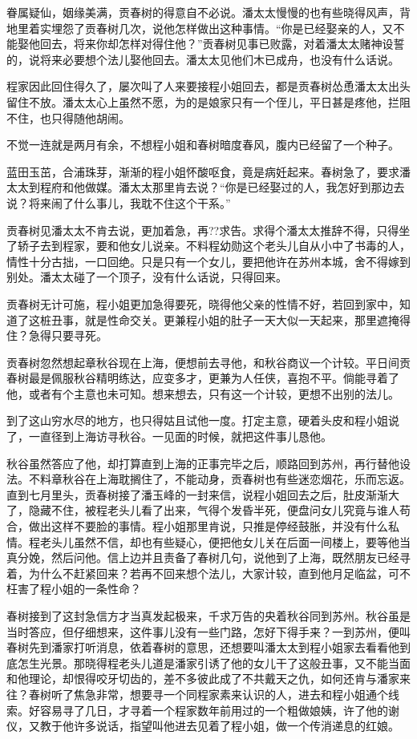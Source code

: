 \documentclass[12pt,UTF8]{ctexbook}
\begin{document}
{{{眷属疑仙，姻缘美满，贡春树的得意自不必说。潘太太慢慢的也有些晓得风声，背地里着实埋怨了贡春树几次，说他怎样做出这种事情。“你是已经娶亲的人，又不能娶他回去，将来你却怎样对得住他？”贡春树见事已败露，对着潘太太赌神设誓的，说将来必要想个法儿娶他回去。潘太太见他们木已成舟，也没有什么话说。

程家因此回住得久了，屡次叫了人来要接程小姐回去，都是贡春树怂恿潘太太出头留住不放。潘太太心上虽然不愿，为的是娘家只有一个侄儿，平日甚是疼他，拦阻不住，也只得随他胡闹。

不觉一连就是两月有余，不想程小姐和春树暗度春风，腹内已经留了一个种子。

蓝田玉茁，合浦珠芽，渐渐的程小姐怀酸呕食，竟是病妊起来。春树急了，要求潘太太到程府和他做媒。潘太太那里肯去说？“你是已经娶过的人，我怎好到那边去说？将来闹了什么事儿，我耽不住这个干系。”

贡春树见潘太太不肯去说，更加着急，再??求告。求得个潘太太推辞不得，只得坐了轿子去到程家，要和他女儿说亲。不料程幼勋这个老头儿自从小中了书毒的人，情性十分古拙，一口回绝。只是只有一个女儿，要把他许在苏州本城，舍不得嫁到别处。潘太太碰了一个顶子，没有什么话说，只得回来。

贡春树无计可施，程小姐更加急得要死，晓得他父亲的性情不好，若回到家中，知道了这桩丑事，就是性命交关。更兼程小姐的肚子一天大似一天起来，那里遮掩得住？急得只要寻死。

贡春树忽然想起章秋谷现在上海，便想前去寻他，和秋谷商议一个计较。平日间贡春树最是佩服秋谷精明练达，应变多才，更兼为人任侠，喜抱不平。倘能寻着了他，或者有个主意也未可知。想来想去，只有这一个计较，更想不出别的法儿。

到了这山穷水尽的地方，也只得姑且试他一度。打定主意，硬着头皮和程小姐说了，一直径到上海访寻秋谷。一见面的时候，就把这件事儿恳他。

秋谷虽然答应了他，却打算直到上海的正事完毕之后，顺路回到苏州，再行替他设法。不料章秋谷在上海耽搁住了，不能动身，贡春树也有些迷恋烟花，乐而忘返。直到七月里头，贡春树接了潘玉峰的一封来信，说程小姐回去之后，肚皮渐渐大了，隐藏不住，被程老头儿看了出来，气得个发昏半死，便盘问女儿究竟与谁人苟合，做出这样不要脸的事情。程小姐那里肯说，只推是停经鼓胀，并没有什么私情。程老头儿虽然不信，却也有些疑心，便把他女儿关在后面一间楼上，要等他当真分娩，然后问他。信上边并且责备了春树几句，说他到了上海，既然朋友已经寻着，为什么不赶紧回来？若再不回来想个法儿，大家计较，直到他月足临盆，可不枉害了程小姐的一条性命？

春树接到了这封急信方才当真发起极来，千求万告的央着秋谷同到苏州。秋谷虽是当时答应，但仔细想来，这件事儿没有一些门路，怎好下得手来？一到苏州，便叫春树先到潘家打听消息，依着春树的意思，还想要叫潘太太到程小姐家去看看他到底怎生光景。那晓得程老头儿道是潘家引诱了他的女儿干了这般丑事，又不能当面和他理论，却恨得咬牙切齿的，差不多彼此成了不共戴天之仇，如何还肯与潘家来往？春树听了焦急非常，想要寻一个同程家素来认识的人，进去和程小姐通个线索。好容易寻了几日，才寻着一个程家数年前用过的一个粗做娘姨，许了他的谢仪，又教于他许多说话，指望叫他进去见着了程小姐，做一个传消递息的红娘。

}}}
\end{document}
